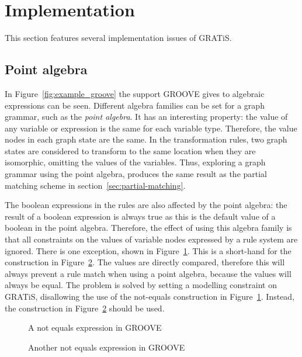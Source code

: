 \section{Implementation}\label{sec:implementation}

This section features several implementation issues of GRATiS.

\subsection{Point algebra}
In Figure~\ref{fig:example_groove} the support GROOVE gives to algebraic expressions can be seen. Different algebra families can be set for a graph grammar, such as the \textit{point algebra}. It has an interesting property: the value of any variable or expression is the same for each variable type. Therefore, the value nodes in each graph state are the same. In the transformation rules, two graph states are considered to transform to the same location when they are isomorphic, omitting the values of the variables. Thus, exploring a graph grammar using the point algebra, produces the same result as the partial matching scheme in section~\ref{sec:partial-matching}. 

The boolean expressions in the rules are also affected by the point algebra: the result of a boolean expression is always true as this is the default value of a boolean in the point algebra. Therefore, the effect of using this algebra family is that all constraints on the values of variable nodes expressed by a rule system are ignored. There is one exception, shown in Figure~\ref{fig:not_equals_wrong}. This is a short-hand for the construction in Figure~\ref{fig:not_equals_right}. The values are directly compared, therefore this will always prevent a rule match when using a point algebra, because the values will always be equal. The problem is solved by setting a modelling constraint on GRATiS, disallowing the use of the not-equals construction in Figure~\ref{fig:not_equals_wrong}. Instead, the construction in Figure~\ref{fig:not_equals_right} should be used.

\begin{figure}[ht]
  \begin{center}
    
  \end{center}
  \caption{A not equals expression in GROOVE}
  \label{fig:not_equals_wrong}
\end{figure}

\begin{figure}[ht]
  \begin{center}
    
  \end{center}
  \caption{Another not equals expression in GROOVE}
  \label{fig:not_equals_right}
\end{figure}

